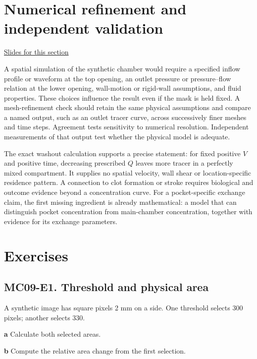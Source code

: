 \documentclass[11pt,letterpaper]{article}
\theoremstyle{definition}\newtheorem{definition}{Definition}\newtheorem{example}{Example}
\numberwithin{equation}{section}
\begin{document}
\section{Numerical refinement and independent validation}
\hypertarget{note-numerical-refinement-and-independent-validation}{}\label{note:numerical-refinement-and-independent-validation}
{\small \href{slides.html\#frame=two-different-tests\&step=1}{Slides for this section}}\par
A spatial simulation of the synthetic chamber would require a specified inflow profile or waveform at the top opening, an outlet pressure or pressure--flow relation at the lower opening, wall-motion or rigid-wall assumptions, and fluid properties. These choices influence the result even if the mask is held fixed. A mesh-refinement check should retain the same physical assumptions and compare a named output, such as an outlet tracer curve, across successively finer meshes and time steps. Agreement tests sensitivity to numerical resolution. Independent measurements of that output test whether the physical model is adequate.

The exact washout calculation supports a precise statement: for fixed positive $V$ and positive time, decreasing prescribed $Q$ leaves more tracer in a perfectly mixed compartment. It supplies no spatial velocity, wall shear or location-specific residence pattern. A connection to clot formation or stroke requires biological and outcome evidence beyond a concentration curve. For a pocket-specific exchange claim, the first missing ingredient is already mathematical: a model that can distinguish pocket concentration from main-chamber concentration, together with evidence for its exchange parameters.
\bigskip
\section*{Exercises}
\par\noindent\begin{minipage}{\linewidth}
\subsection*{MC09-E1. Threshold and physical area}
A synthetic image has square pixels 2 mm on a side. One threshold selects 300 pixels; another selects 330.

\textbf{a} Calculate both selected areas.

\end{minipage}\par\medskip
\textbf{b} Compute the relative area change from the first selection.
\end{document}
